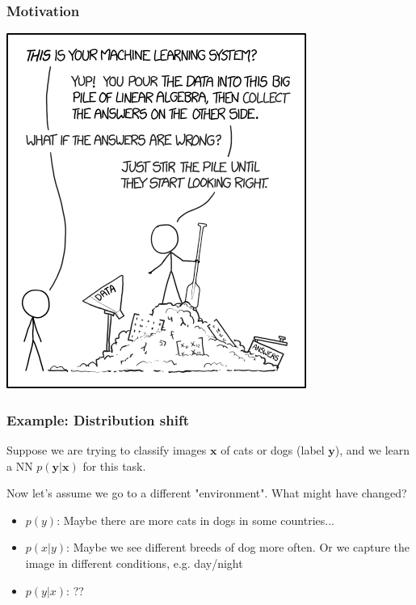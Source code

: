 \documentclass[handout]{beamer}
\begin{document}
\begin{frame}
\frametitle{Motivation}

\begin{center}
\includegraphics[scale=0.45]{figures/xkcd_data.png}
\end{center}
         
\end{frame}

\begin{frame}
\frametitle{Example: Distribution shift}
Suppose we are trying to classify images $\textbf{x}$ of cats or dogs (label $\textbf{y}$), and we learn a NN $p(\textbf{y}|\textbf{x})$ for this task.

\pause
\bigskip
Now let's assume we go to a different "environment". What might have changed?
\pause
\begin{itemize}
	\item $p(y)$: Maybe there are more cats in dogs in some countries...
	\pause
	\item $p(x|y)$: Maybe we see different breeds of dog more often. Or we capture the image in different conditions, e.g. day/night
	\pause
	\item $p(y|x)$: ??
\end{itemize}

\note[]{
	
}
\end{frame}
\end{document}
